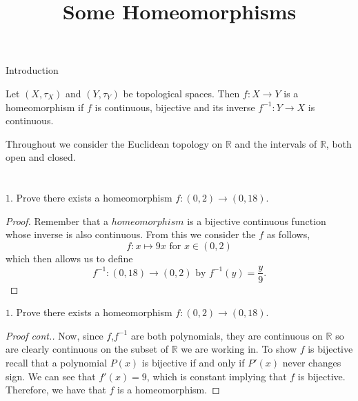 \documentclass{beamer}
\title{Some Homeomorphisms}
\author{}
\date{}
\begin{document}
\begin{frame}
    \titlepage 
\end{frame}

\logo{}


\begin{frame}{Introduction}
    \begin{definition}
Let $(X,\tau_{X})$ and $(Y,\tau_{Y})$ be topological spaces. Then $f:X\to Y$ is a homeomorphism if $f$ is continuous, bijective and its inverse $f^{-1}:Y\to X$ is continuous.    
    \end{definition}
Throughout we consider the Euclidean topology on $\mathbb{R}$ and the intervals of $\mathbb{R}$, both open and closed.    
\end{frame}


\section{}
\begin{frame}{}
\begin{block}{}
$1.$ Prove there exists a homeomorphism $f:(0,2)\to(0,18)$.
\end{block}
\newline
\begin{proof}
Remember that a $homeomorphism$ is a bijective continuous function whose inverse is also continuous.
From this we consider the $f$ as follows, 
$$ f: x \mapsto 9x \text{ for } x\in(0,2) $$ which then allows us to define 
$$ f^{-1}:(0,18)\to(0,2) \text{ by } f^{-1}(y)=\frac{y}{9}\text{.} $$
\renewcommand{\qedsymbol}{}
\end{proof}
\end{frame}
    
\begin{frame}
\begin{block}{}
$1.$ Prove there exists a homeomorphism $f:(0,2)\to(0,18)$.
\end{block}
\begin{proof}[Proof cont.]
Now, since $f$,$f^{-1}$ are both polynomials, they are continuous on $\mathbb{R}$ so are clearly continuous on the subset of $\mathbb{R}$ we are working in. To show $f$ is bijective recall that a polynomial $P(x)$ is bijective if and only if $P'(x)$ never changes sign. We can see that $f'(x)=9$, which is constant implying that $f$ is bijective. Therefore, we have that $f$ is a homeomorphism.
\end{proof}
\end{frame} 
\end{document}

